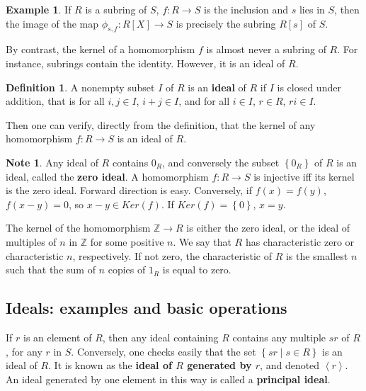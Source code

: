 \documentclass{article}
\newcommand{\Z}{\mathbb{Z}}
\newcommand{\rb}[1]{\left( #1 \right)}
\renewcommand{\sb}[1]{\left[ #1 \right]}
\newcommand{\cb}[1]{\left\{ #1 \right\}}
\newcommand{\ab}[1]{\left\langle #1 \right\rangle}
\theoremstyle{definition}\newtheorem{definition}{Definition}[section]
\theoremstyle{definition}\newtheorem{remark}[definition]{Remark}
\theoremstyle{definition}\newtheorem*{example}{Example}
\theoremstyle{definition}\newtheorem*{note}{Note}
\begin{document}
\begin{example}
If $ R $ is a subring of $ S $, $ f : R \to S $ is the inclusion and $ s $ lies in $ S $, then the image of the map $ \phi_{s, f} : R\sb{X} \to S $ is precisely the subring $ R\sb{s} $ of $ S $.
\end{example}

By contrast, the kernel of a homomorphism $ f $ is almost never a subring of $ R $. For instance, subrings contain the identity. However, it is an ideal of $ R $.


\begin{definition}
A nonempty subset $ I $ of $ R $ is an \textbf{ideal} of $ R $ if $ I $ is closed under addition, that is for all $ i, j \in I $, $ i + j \in I $, and for all $ i \in I $, $ r \in R $, $ ri \in I $.
\end{definition}

Then one can verify, directly from the definition, that the kernel of any homomorphism $ f : R \to S $ is an ideal of $ R $.

\begin{note}
Any ideal of $ R $ contains $ 0_R $, and conversely the subset $ \cb{0_R} $ of $ R $ is an ideal, called the \textbf{zero ideal}. A homomorphism $ f : R \to S $ is injective iff its kernel is the zero ideal. Forward direction is easy. Conversely, if $ f\rb{x} = f\rb{y} $, $ f\rb{x - y} = 0 $, so $ x - y \in Ker\rb{f} $. If $ Ker\rb{f} = \cb{0} $, $ x = y $.
\end{note}

The kernel of the homomorphism $ \Z \to R $ is either the zero ideal, or the ideal of multiples of $ n $ in $ \Z $ for some positive $ n $. We say that $ R $ has characteristic zero or characteristic $ n $, respectively. If not zero, the characteristic of $ R $ is the smallest $ n $ such that the sum of $ n $ copies of $ 1_R $ is equal to zero.

\subsection{Ideals: examples and basic operations}

If $ r $ is an element of $ R $, then any ideal containing $ R $ contains any multiple $ sr $ of $ R $, for any $ r $ in $ S $. Conversely, one checks easily that the set $ \cb{sr \mid s \in R} $ is an ideal of $ R $. It is known as the \textbf{ideal of $ R $ generated by $ r $}, and denoted $ \ab{r} $. An ideal generated by one element in this way is called a \textbf{principal ideal}.
\end{document}
